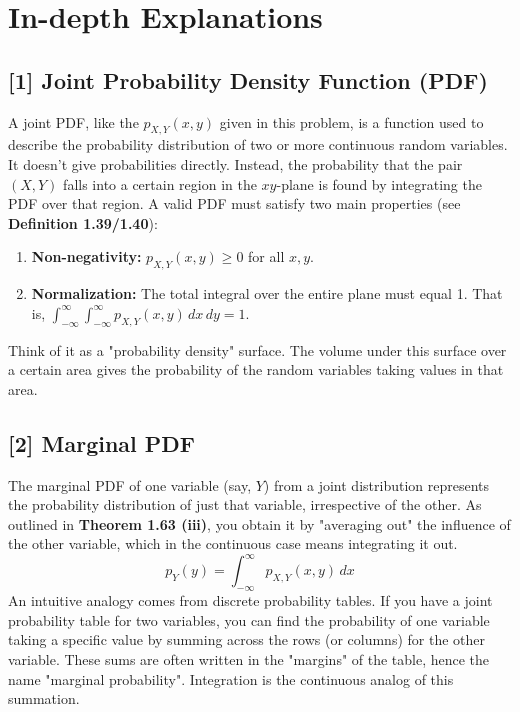 \documentclass[11pt,a4paper]{article}
\begin{document}
\newpage
\section*{In-depth Explanations}

\subsection*{\hypertarget{note1}{[1]} Joint Probability Density Function (PDF)}
A joint PDF, like the $p_{X,Y}(x,y)$ given in this problem, is a function used to describe the probability distribution of two or more continuous random variables. It doesn't give probabilities directly. Instead, the probability that the pair $(X, Y)$ falls into a certain region in the $xy$-plane is found by integrating the PDF over that region.
A valid PDF must satisfy two main properties (see \textbf{Definition 1.39/1.40}):
\begin{enumerate}
    \item \textbf{Non-negativity:} $p_{X,Y}(x,y) \ge 0$ for all $x, y$.
    \item \textbf{Normalization:} The total integral over the entire plane must equal 1. That is, $\int_{-\infty}^{\infty} \int_{-\infty}^{\infty} p_{X,Y}(x,y) \,dx\,dy = 1$.
\end{enumerate}
Think of it as a "probability density" surface. The volume under this surface over a certain area gives the probability of the random variables taking values in that area.

\subsection*{\hypertarget{note2}{[2]} Marginal PDF}
The marginal PDF of one variable (say, $Y$) from a joint distribution represents the probability distribution of just that variable, irrespective of the other. As outlined in \textbf{Theorem 1.63 (iii)}, you obtain it by "averaging out" the influence of the other variable, which in the continuous case means integrating it out.
\[ p_Y(y) = \int_{-\infty}^{\infty} p_{X,Y}(x,y) \,dx \]
An intuitive analogy comes from discrete probability tables. If you have a joint probability table for two variables, you can find the probability of one variable taking a specific value by summing across the rows (or columns) for the other variable. These sums are often written in the "margins" of the table, hence the name "marginal probability". Integration is the continuous analog of this summation.
\end{document}
